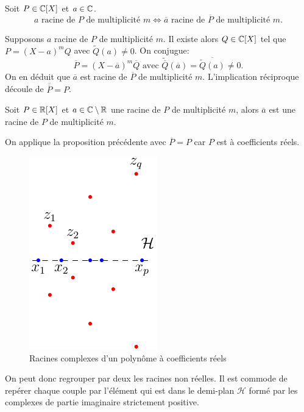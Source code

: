 \begin{prop}
 Soit $P\in \mathbb{C}[X]$ et $a\in \mathbb{C}$.
\[
  a \text{ racine de $P$ de multiplicité } m \Leftrightarrow \overline{a} \text{ racine de $\overline{P}$ de multiplicité } m .
\]
\end{prop}
\begin{demo}
Supposons $a$ racine de $P$ de multiplicité $m$. Il existe alors $Q \in \mathbb{C}[X]$ tel que $P = (X-a)^m Q$ avec $\widetilde{Q}(a)\neq 0$. On conjugue:
\[
  \overline{P} = (X- \overline{a})^m \overline{Q} \text{ avec } \widetilde{\overline{Q}}(\overline{a}) = \overline{\widetilde{Q}(a)}\neq 0.
\]
On en déduit que $\overline{a}$ est racine de $\overline{P}$ de multiplicité $m$. L'implication réciproque découle de $\overline{\overline{P}} = P$.
\end{demo}

\begin{prop}
 Soit $P\in \mathbb{R}[X]$ et $a\in \mathbb{C}\setminus \mathbb{R}$ une racine de $P$ de multiplicité $m$, alors $\overline{a}$ est une racine de $P$ de multiplicité $m$.
\end{prop}
\begin{demo}
 On applique la proposition précédente avec $\overline{P}=P$ car $P$ est à coefficients réels.
\end{demo}

\begin{figure}[ht]{}
 \centering
 \includegraphics{C1622_1.pdf}
 \caption{Racines complexes d'un polynôme à coefficients réels}
 \label{fig:C1622_1}
\end{figure}

\begin{rem}
 On peut donc regrouper par deux les racines non réelles. Il est commode de repérer chaque couple par l'élément qui est dans le demi-plan $\mathcal H$ formé par les complexes de partie imaginaire strictement positive.
\end{rem}



